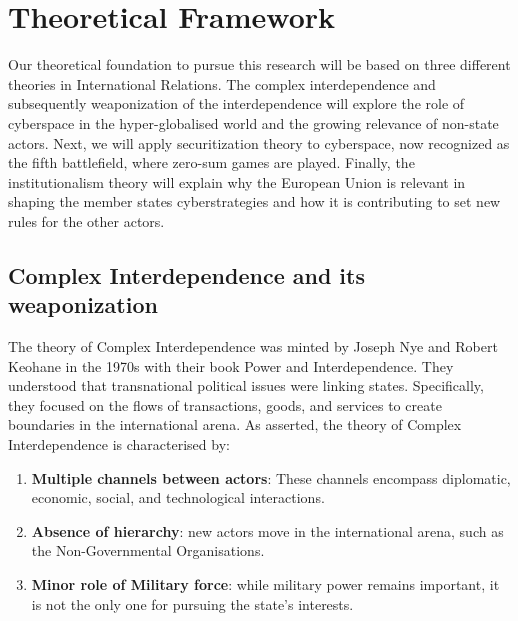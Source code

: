 \chapter{Theoretical Framework}

Our theoretical foundation to pursue this research will be based on three different theories in International Relations. The complex interdependence and subsequently weaponization of the interdependence will explore the role of cyberspace in the hyper-globalised world and the growing relevance of non-state actors. Next, we will apply securitization theory to cyberspace, now recognized as the fifth battlefield, where zero-sum games are played. Finally, the institutionalism theory will explain why the European Union is relevant in shaping the member states cyberstrategies and how it is contributing to set new rules for the other actors. 

\section{Complex Interdependence and its weaponization}

The theory of Complex Interdependence was minted by Joseph Nye and Robert Keohane in the 1970s with their book Power and Interdependence. They understood that transnational political issues were linking states. Specifically, they focused on the flows of transactions, goods, and services to create boundaries in the international arena. As \textcite{nye_1971_transnational} asserted, the theory of Complex Interdependence is characterised by:

\begin{enumerate}
    \item \textbf{Multiple channels between actors}: These channels encompass diplomatic, economic, social, and technological interactions.
    \item \textbf{Absence of hierarchy}: new actors move in the international arena, such as the Non-Governmental Organisations. 
    \item \textbf{Minor role of Military force}: while military power remains important, it is not the only one for pursuing the state’s interests. 

\end{enumerate}

